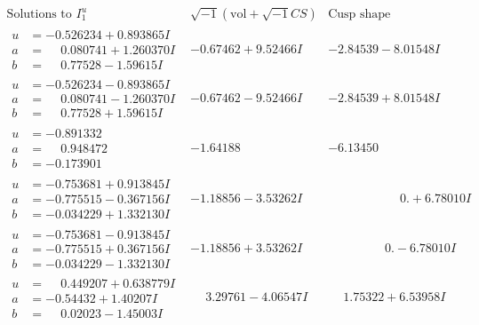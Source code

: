 \documentclass[1p]{elsarticle_modified}
\theoremstyle{definition}
\newcommand{\I}{\sqrt{-1}}
\begin{document}
$$\begin{array}{c|c|c}  
\text{Solutions to }I^u_{1}& \I (\text{vol} + \sqrt{-1}CS) & \text{Cusp shape}\\
 \hline 
\begin{aligned}
u &= -0.526234 + 0.893865 I \\
a &= \phantom{-}0.080741 + 1.260370 I \\
b &= \phantom{-}0.77528 - 1.59615 I\end{aligned}
 & -0.67462 + 9.52466 I & -2.84539 - 8.01548 I \\ \hline\begin{aligned}
u &= -0.526234 - 0.893865 I \\
a &= \phantom{-}0.080741 - 1.260370 I \\
b &= \phantom{-}0.77528 + 1.59615 I\end{aligned}
 & -0.67462 - 9.52466 I & -2.84539 + 8.01548 I \\ \hline\begin{aligned}
u &= -0.891332\phantom{ +0.000000I} \\
a &= \phantom{-}0.948472\phantom{ +0.000000I} \\
b &= -0.173901\phantom{ +0.000000I}\end{aligned}
 & -1.64188\phantom{ +0.000000I} & -6.13450\phantom{ +0.000000I} \\ \hline\begin{aligned}
u &= -0.753681 + 0.913845 I \\
a &= -0.775515 - 0.367156 I \\
b &= -0.034229 + 1.332130 I\end{aligned}
 & -1.18856 - 3.53262 I & \phantom{-0.000000 -}0. + 6.78010 I \\ \hline\begin{aligned}
u &= -0.753681 - 0.913845 I \\
a &= -0.775515 + 0.367156 I \\
b &= -0.034229 - 1.332130 I\end{aligned}
 & -1.18856 + 3.53262 I & \phantom{-0.000000 } 0. - 6.78010 I \\ \hline\begin{aligned}
u &= \phantom{-}0.449207 + 0.638779 I \\
a &= -0.54432 + 1.40207 I \\
b &= \phantom{-}0.02023 - 1.45003 I\end{aligned}
 & \phantom{-}3.29761 - 4.06547 I & \phantom{-}1.75322 + 6.53958 I \\ \hline\begin{aligned}

\end{aligned}
\end{array}$$
\end{document}
